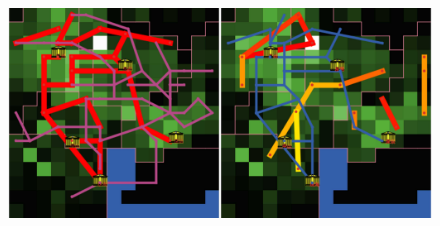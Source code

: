 \begin{figure}
	\includegraphics[width=\linewidth]{Figures/Final/A-lutecia-realsetup.jpg}
	\appcaption{}{\label{fig:app:lutecia:realsetup}}
\end{figure}

 









